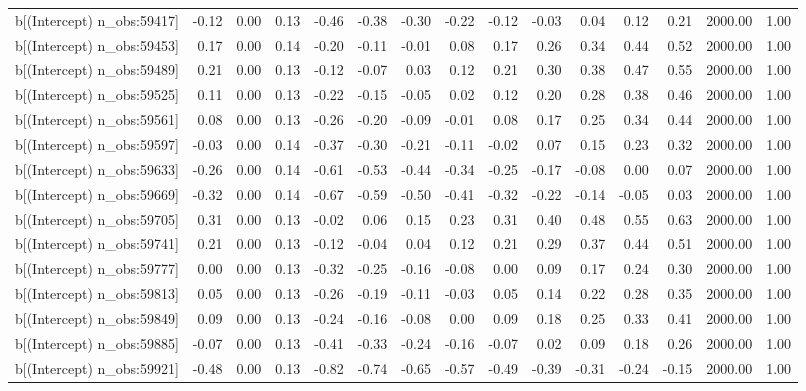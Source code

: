 \begin{table}[ht]
\begin{tabular}{rrrrrrrrrrrrrrr}
  b[(Intercept) n\_obs:59417] & -0.12 & 0.00 & 0.13 & -0.46 & -0.38 & -0.30 & -0.22 & -0.12 & -0.03 & 0.04 & 0.12 & 0.21 & 2000.00 & 1.00 \\ 
  b[(Intercept) n\_obs:59453] & 0.17 & 0.00 & 0.14 & -0.20 & -0.11 & -0.01 & 0.08 & 0.17 & 0.26 & 0.34 & 0.44 & 0.52 & 2000.00 & 1.00 \\ 
  b[(Intercept) n\_obs:59489] & 0.21 & 0.00 & 0.13 & -0.12 & -0.07 & 0.03 & 0.12 & 0.21 & 0.30 & 0.38 & 0.47 & 0.55 & 2000.00 & 1.00 \\ 
  b[(Intercept) n\_obs:59525] & 0.11 & 0.00 & 0.13 & -0.22 & -0.15 & -0.05 & 0.02 & 0.12 & 0.20 & 0.28 & 0.38 & 0.46 & 2000.00 & 1.00 \\ 
  b[(Intercept) n\_obs:59561] & 0.08 & 0.00 & 0.13 & -0.26 & -0.20 & -0.09 & -0.01 & 0.08 & 0.17 & 0.25 & 0.34 & 0.44 & 2000.00 & 1.00 \\ 
  b[(Intercept) n\_obs:59597] & -0.03 & 0.00 & 0.14 & -0.37 & -0.30 & -0.21 & -0.11 & -0.02 & 0.07 & 0.15 & 0.23 & 0.32 & 2000.00 & 1.00 \\ 
  b[(Intercept) n\_obs:59633] & -0.26 & 0.00 & 0.14 & -0.61 & -0.53 & -0.44 & -0.34 & -0.25 & -0.17 & -0.08 & 0.00 & 0.07 & 2000.00 & 1.00 \\ 
  b[(Intercept) n\_obs:59669] & -0.32 & 0.00 & 0.14 & -0.67 & -0.59 & -0.50 & -0.41 & -0.32 & -0.22 & -0.14 & -0.05 & 0.03 & 2000.00 & 1.00 \\ 
  b[(Intercept) n\_obs:59705] & 0.31 & 0.00 & 0.13 & -0.02 & 0.06 & 0.15 & 0.23 & 0.31 & 0.40 & 0.48 & 0.55 & 0.63 & 2000.00 & 1.00 \\ 
  b[(Intercept) n\_obs:59741] & 0.21 & 0.00 & 0.13 & -0.12 & -0.04 & 0.04 & 0.12 & 0.21 & 0.29 & 0.37 & 0.44 & 0.51 & 2000.00 & 1.00 \\ 
  b[(Intercept) n\_obs:59777] & 0.00 & 0.00 & 0.13 & -0.32 & -0.25 & -0.16 & -0.08 & 0.00 & 0.09 & 0.17 & 0.24 & 0.30 & 2000.00 & 1.00 \\ 
  b[(Intercept) n\_obs:59813] & 0.05 & 0.00 & 0.13 & -0.26 & -0.19 & -0.11 & -0.03 & 0.05 & 0.14 & 0.22 & 0.28 & 0.35 & 2000.00 & 1.00 \\ 
  b[(Intercept) n\_obs:59849] & 0.09 & 0.00 & 0.13 & -0.24 & -0.16 & -0.08 & 0.00 & 0.09 & 0.18 & 0.25 & 0.33 & 0.41 & 2000.00 & 1.00 \\ 
  b[(Intercept) n\_obs:59885] & -0.07 & 0.00 & 0.13 & -0.41 & -0.33 & -0.24 & -0.16 & -0.07 & 0.02 & 0.09 & 0.18 & 0.26 & 2000.00 & 1.00 \\ 
  b[(Intercept) n\_obs:59921] & -0.48 & 0.00 & 0.13 & -0.82 & -0.74 & -0.65 & -0.57 & -0.49 & -0.39 & -0.31 & -0.24 & -0.15 & 2000.00 & 1.00 \\ 

\end{tabular}
\end{table}
